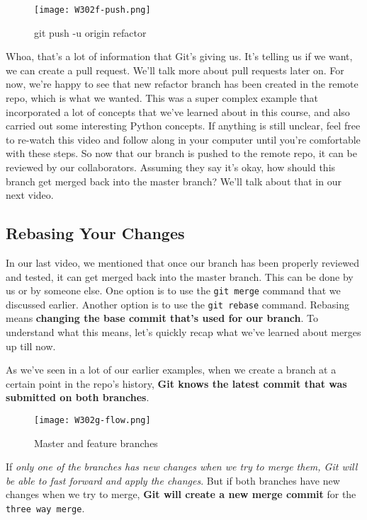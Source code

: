 \begin{figure} 
 	\caption{git push -u origin refactor}
 	\centering
 	\texttt{[image: W302f-push.png]}
	\label{W302f-push}
\end{figure}

Whoa, that's a lot of information that Git's giving us. It's telling us if we want, we can create a pull request. We'll talk more about pull requests later on. For now, we're happy to see that new refactor branch has been created in the remote repo, which is what we wanted. This was a super complex example that incorporated a lot of concepts that we've learned about in this course, and also carried out some interesting Python concepts. If anything is still unclear, feel free to re-watch this video and follow along in your computer until you're comfortable with these steps. So now that our branch is pushed to the remote repo, it can be reviewed by our collaborators. Assuming they say it's okay, how should this branch get merged back into the master branch? We'll talk about that in our next video.


\subsection{Rebasing Your Changes} \label{W303c}

In our last video, we mentioned that once our branch has been properly reviewed and tested, it can get merged back into the master branch. This can be done by us or by someone else. One option is to use the \verb|git merge| command that we discussed earlier. Another option is to use the \verb|git rebase| command. Rebasing means \textbf{changing the base commit that's used for our branch}. To understand what this means, let's quickly recap what we've learned about merges up till now. 

As we've seen in a lot of our earlier examples, when we create a branch at a certain point in the repo's history, \textbf{Git knows the latest commit that was submitted on both branches}. 

\begin{figure} 
	\caption{Master and feature branches}
	\centering
	\texttt{[image: W302g-flow.png]}
	\label{W302g-flow}
\end{figure}

If \textit{only one of the branches has new changes when we try to merge them, Git will be able to fast forward and apply the changes}. But if both branches have new changes when we try to merge, \textbf{Git will create a new merge commit} for the \verb|three way merge|.

